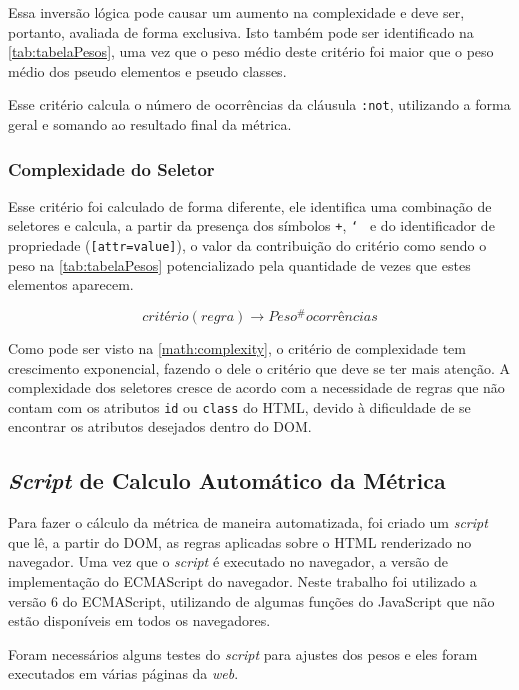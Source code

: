 Essa inversão lógica pode causar um aumento na complexidade e deve ser, portanto, avaliada de forma exclusiva. Isto também pode ser identificado na \autoref{tab:tabelaPesos}, uma vez que o peso médio deste critério foi maior que o peso médio dos pseudo elementos e pseudo classes.

Esse critério calcula o número de ocorrências da cláusula \texttt{:not}, utilizando a forma geral e somando ao resultado final da métrica.

\subsubsection{Complexidade do Seletor}
Esse critério foi calculado de forma diferente, ele identifica uma combinação de seletores e calcula, a partir da presença dos símbolos \texttt{+}, \texttt{\char`~} e do identificador de propriedade (\texttt{[attr=value]}), o valor da contribuição do critério como sendo o peso na \autoref{tab:tabelaPesos} potencializado pela quantidade de vezes que estes elementos aparecem.

\begin{equation}
\label{math:complexity}
	critério(regra) \rightarrow Peso^\#ocorrências
\end{equation}

Como pode ser visto na \autoref{math:complexity}, o critério de complexidade tem crescimento exponencial, fazendo o dele o critério que deve se ter mais atenção. A complexidade dos seletores cresce de acordo com a necessidade de regras que não contam com os atributos \texttt{id} ou \texttt{class} do HTML, devido à dificuldade de se encontrar os atributos desejados dentro do DOM.

\subsection{\textit{Script} de Calculo Automático da Métrica}

Para fazer o cálculo da métrica de maneira automatizada, foi criado um \textit{script} que lê, a partir do DOM, as regras aplicadas sobre o HTML renderizado no navegador. Uma vez que o \textit{script} é executado no navegador, a versão de implementação do ECMAScript do navegador. Neste trabalho foi utilizado a versão 6 do ECMAScript, utilizando de algumas funções do JavaScript que não estão disponíveis em todos os navegadores.

Foram necessários alguns testes do \textit{script} para ajustes dos pesos e eles foram executados em várias páginas da \textit{web}.

